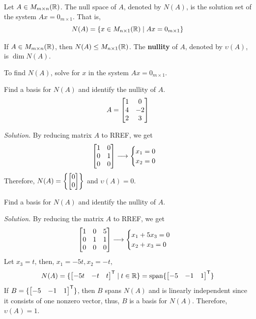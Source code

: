 \begin{definition}
Let $A \in M_{m \times n}(\mathbb{R})$. The null space of $A$, denoted by $N(A)$, is the solution set of the system $Ax = 0_{m \times 1}$. That is,
$$N(A) = \{x \in M_{n \times 1}(\mathbb{R}) \mid Ax = 0_{m \times 1}\}$$
\end{definition}

\begin{remark}
If $A \in M_{m \times n}(\mathbb{R})$, then $N(A) \leq M_{n \times 1}(\mathbb{R})$. The \textbf{nullity} of $A$, denoted by $\upsilon(A)$, is $\dim N(A)$.
\end{remark}

To find $N(A)$, solve for $x$ in the system $Ax = 0_{m \times 1}$.

\begin{example}
Find a basis for $N(A)$ and identify the nullity of $A$.
$$A = \begin{bmatrix} 1 & 0 \\ 4 & -2 \\ 2 & 3 \end{bmatrix}$$
\end{example}

\textit{Solution.} By reducing matrix $A$ to RREF, we get
$$\begin{bmatrix} 1 & 0 \\ 0 & 1 \\ 0 & 0 \end{bmatrix} \longrightarrow 
\begin{cases}
x_1 = 0 \\
x_2 = 0
\end{cases}
$$
Therefore, $N(A) = \left\{\begin{bmatrix} 0 \\ 0 \end{bmatrix}\right\}$ and $\upsilon(A) = 0$.

\begin{example}
Find a basis for $N(A)$ and identify the nullity of $A$.

\textit{Solution.} By reducing the matrix $A$ to RREF, we get
$$\begin{bmatrix} 1 & 0 & 5 \\ 0 & 1 & 1 \\ 0 & 0 & 0 \end{bmatrix} \longrightarrow
\begin{cases}
    x_1 + 5x_3 = 0 \\
    x_2 + x_3 = 0
\end{cases}$$
Let $x_3 = t$, then, $x_1 = -5t, x_2 = -t$,
$$N(A) = \{\begin{bmatrix} -5t & -t & t \end{bmatrix}^{\mathsf{T}} \mid t \in \mathbb{R}\} = \operatorname{span}\{\begin{bmatrix} -5 & -1 & 1 \end{bmatrix}^{\mathsf{T}}\}$$
If $B = \{\begin{bmatrix} -5 & -1 & 1 \end{bmatrix}^{\mathsf{T}}\}$, then $B$ spans $N(A)$ and is linearly independent since 
it consists of one nonzero vector, thus, $B$ is a basis for $N(A)$. Therefore, $\upsilon(A) = 1$.
\end{example}

